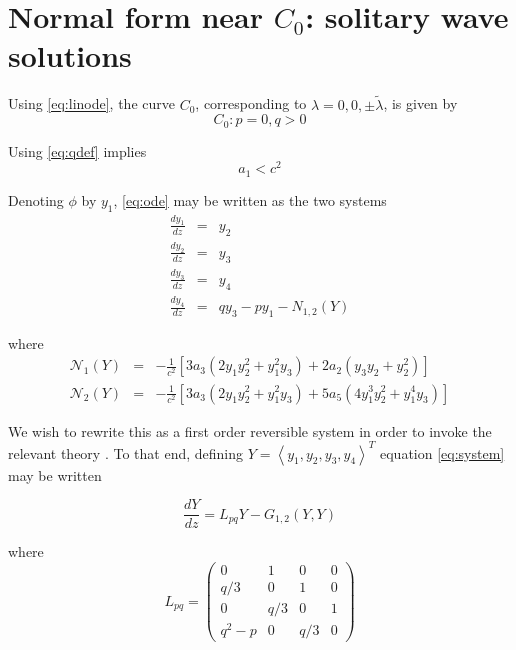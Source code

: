\section{Normal form near $C_0$: solitary wave solutions}

Using \eqref{eq:linode}, the curve $C_0$, corresponding to $\lambda = 0,0,\pm \tilde{ \lambda } $, is given by
\begin{equation}
C_0: { p=0, q > 0 }
\end{equation}

Using \eqref{eq:qdef} implies
\begin{equation}
a_1 < c^2 
\end{equation}

Denoting $\phi$ by $y_1$, \eqref{eq:ode} may be written as the two systems
\begin{subequations}\label{eq:system}
\begin{eqnarray}
\frac{d y_1 }{d z} &=& y_2 \\
\frac{d y_2 }{d z} &=& y_3 \\
\frac{d y_3 }{d z} &=& y_4 \\
\frac{d y_4 }{d z} &=& q y_3 - p y_1 - N_{1,2}(Y)
\end{eqnarray}
\end{subequations}

where
\begin{subequations}
\begin{eqnarray}
\mathcal{N}_1\left(Y\right) &=& - \frac{1}{c^2}\left[  3 a_3 \left( 2 y_1 y_2^2 + y_1^2 y_3 \right) + 2 a_2\left( y_3 y_2 + y_2^2\right) \right] \\
\mathcal{N}_2\left(Y\right) &=& - \frac{1}{c^2}\left[ 3 a_3 \left( 2 y_1 y_2^2 + y_1^2 y_3\right) + 5 a_5 \left( 4 y_1^3 y_2^2 + y_1^4 y_3 \right) \right]
\end{eqnarray}
\end{subequations}

We wish to rewrite this as a first order reversible system in order to invoke the relevant theory \cite{IA}. 
To that end, defining  $Y=\left<y_1,y_2,y_3,y_4\right>^T$ equation \eqref{eq:system} may be written 

\begin{equation}\label{eq:bilinear}
\frac{ dY }{ dz } = L_{pq} Y - G_{1,2}(Y,Y)
\end{equation}

where 
\begin{equation}
L_{pq} = \left( 
\begin{array}{cccc}
0&1&0&0\\
q/3&0&1&0\\
0&q/3&0&1\\
q^2 - p &0&q/3&0 \end{array} \right)
 \end{equation}

